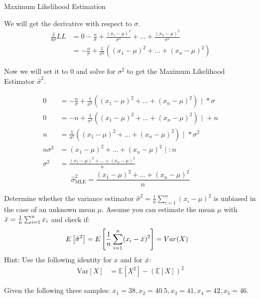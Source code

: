 \documentclass[
	english,
        solution=true
	]{tudaexercise}
\begin{document}
\begin{task}[points=20]{Maximum Likelihood Estimation}
\begin{subtask}[points=5]
\begin{solution}
We will get the derivative with respect to $\sigma$.
\begin{align*}
    \frac{\delta}{\delta \sigma} LL &= 0-\frac{n}{\sigma}+\frac{(x_1-\mu)^2}{\sigma^3}+...+\frac{(x_n-\mu)^2}{\sigma^3} \\
    &= -\frac{n}{\sigma} + \frac{1}{\sigma^3}((x_1-\mu)^2+...+(x_n-\mu)^2)
\end{align*}

Now we will set it to $0$ and solve for $\sigma^2$ to get the Maximum Likelihood Estimator $\hat{\sigma}^2$.

\begin{align*}
    0 &= -\frac{n}{\sigma} + \frac{1}{\sigma^3}((x_1-\mu)^2+...+(x_n-\mu)^2) \text{  | } * \sigma \\
    0 &= -n+\frac{1}{\sigma^2}((x_1-\mu)^2+...+(x_n-\mu)^2) \text{  | } +n \\
    n &= \frac{1}{\sigma^2}((x_1-\mu)^2+...+(x_n-\mu)^2) \text{  | } *\sigma^2 \\
    n\sigma^2 &= (x_1-\mu)^2+...+(x_n-\mu)^2 \text{  | } :n \\
    \sigma^2 &= \frac{(x_1-\mu)^2+...+(x_n-\mu)^2}{n}
\end{align*}
\[\hat{\sigma}^2_{\text{MLE}}= \frac{(x_1-\mu)^2+...+(x_n-\mu)^2}{n}\]
\end{solution}
\end{subtask}

\begin{subtask}[points = 3]
Determine whether the variance estimator $\hat{\sigma}^{2}=\frac{1}{n}\sum_{i=1}^{n}(x_{i}  - \mu)^{2}$ is unbiased in the case of an unknown mean $\mu$. Assume you can estimate the mean $\mu$ with $\Bar{x} =  \frac{1}{n} \sum_{i=1}^{n} x_{i} $ and check if: 
\begin{align*}
E\left[\hat{\sigma}^{2}\right] &=E\left[ \frac{1}{n}\sum_{i=1}^{n} (x_{i}  - \Bar{x})^{2}\right]= Var(X)
\end{align*}
Hint: Use the following identity for $x$ and for $\Bar{x}$:
\begin{align*}
    \mathrm{Var}[X] &= \mathbb{E}[X^2] - \left(\mathbb{E}[X]\right)^2   
\end{align*}

\end{subtask}

\begin{solution}

\end{solution}

\begin{subtask}[points=5]
Given the following three samples:
$x_1 = 38, x_2 = 40.5, x_3 = 41, x_4 = 42, x_5 = 46$.


\end{subtask}
\end{task}
\end{document}
